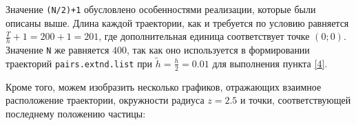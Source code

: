 \documentclass[14pt,a4paper]{scrartcl}
\begin{document}
Значение \texttt{(N/2)+1} обусловлено особенностями реализации, которые были описаны выше. Длина каждой траектории, как и требуется по условию равняется $\frac{T}{h} + 1 = 200 + 1 = 201$, где дополнительная единица соответствует точке $(0;0)$. Значение \texttt{N} же равняется $400$, так как оно используется в формировании траекторий \texttt{pairs.extnd.list} при $\tilde{h} = \frac{h}{2} = 0.01$ для выполнения пункта \ref{4}.


Кроме того, можем изобразить несколько графиков, отражающих взаимное расположение траектории, окружности радиуса $z = 2.5$ и точки, соответствующей последнему положению частицы:



\begin{figure}[H]
	\begin{minipage}[h]{1\linewidth}
		 \\
	\end{minipage}
	\begin{minipage}[h]{1\linewidth}
		 \\
	\end{minipage}
\end{figure}
\end{document}
